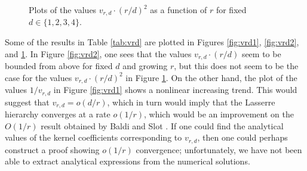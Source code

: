 \documentclass[11pt]{article}
\theoremstyle{definition}
\begin{document}
\begin{figure}[ht!]
\begin{center}

\end{center}
\caption{Plots of the values $v_{r,d}\cdot (r/d)^2$ as a function of $r$ for fixed  $d \in \{1,2,3,4\}$. \label{fig:vrd3}}
\end{figure}

Some of the results in Table \ref{tab:vrd} are plotted in Figures \ref{fig:vrd1}, \ref{fig:vrd2}, and \ref{fig:vrd3}.
In Figure \ref{fig:vrd2}, one sees that the values $v_{r,d}\cdot (r/d)$ seem to be bounded from above for fixed $d$ and growing $r$, but this does not seem to be the case for the values
$v_{r,d}\cdot (r/d)^2$ in Figure \ref{fig:vrd3}.
On the other hand, the plot of the values $1/v_{r,d}$ in Figure \ref{fig:vrd1} shows a nonlinear increasing trend.
This would suggest that $v_{r,d} = o(d/r)$, which in turn would imply that the Lasserre hierarchy converges at a rate $o(1/r)$, which would be an improvement on the $O(1/r)$ result obtained by Baldi and Slot \cite{doi:10.1137/23M1555430}.
If one could find the analytical values of the kernel coefficients corresponding to $v_{r,d}$, then one could perhaps construct a proof showing $o(1/r)$ convergence; unfortunately, we have not been able to extract analytical expressions from the numerical solutions.
\end{document}
